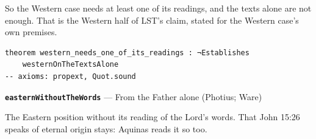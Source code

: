 \documentclass[11pt,paper=\testimonypaper,DIV=13,parskip=false]{scrartcl}
\begin{document}
So the Western case needs at least one of its readings, and the texts alone are not enough. That is the Western half of LST’s claim, stated for the Western case’s own premises.

{\small\begin{verbatim}
theorem western_needs_one_of_its_readings : ¬Establishes
    westernOnTheTextsAlone
-- axioms: propext, Quot.sound
\end{verbatim}}
\par\medskip\noindent\textbf{\texttt{eastern\allowbreak{}Without\allowbreak{}The\allowbreak{}Words}} --- From the Father alone (Photius; Ware)\par\nobreak\noindent
The Eastern position without its reading of the Lord’s words. That John 15:26 speaks of eternal origin stays: Aquinas reads it so too.
\end{document}
